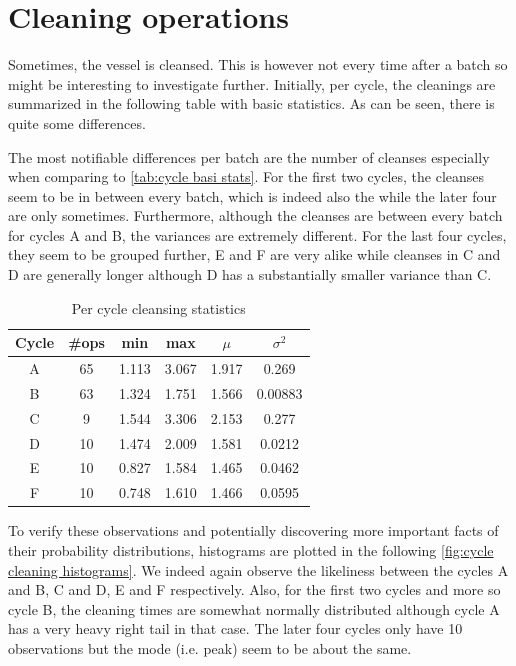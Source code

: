 \documentclass[../Thesis.tex]{subfiles}
\begin{document}


\newpage
\section{Cleaning operations}
Sometimes, the vessel is cleansed. This is however not every time after a batch so might be interesting to investigate further. Initially, per cycle, the cleanings are summarized in the following table with basic statistics. As can be seen, there is quite some differences.

The most notifiable differences per batch are the number of cleanses especially when comparing to \autoref{tab:cycle basi stats}. For the first two cycles, the cleanses seem to be in between every batch, which is indeed also the while the later four are only sometimes. Furthermore, although the cleanses are between every batch for cycles A and B, the variances are extremely different. For the last four cycles, they seem to be grouped further, E and F are very alike while cleanses in C and D are generally longer although D has a substantially smaller variance than C.

\begin{table}[h]
    \centering
    \begin{tabular}{c|c|c|c|c|c}
        Cycle & \#ops & min & max & $\mu$ & $\sigma^2$\\ \hline
        A & 65 & 1.113 & 3.067 & 1.917 & 0.269\\
        B & 63 & 1.324 & 1.751 & 1.566 & 0.00883\\
        C & 9  & 1.544 & 3.306 & 2.153 & 0.277\\
        D & 10 & 1.474 & 2.009 & 1.581 & 0.0212\\
        E & 10 & 0.827 & 1.584 & 1.465 & 0.0462\\
        F & 10 & 0.748 & 1.610 & 1.466 & 0.0595
    \end{tabular}
    \caption{Per cycle cleansing statistics}
    \label{tab:cycle cleansing stats stats}
\end{table}

To verify these observations and potentially discovering more important facts of their probability distributions, histograms are plotted in the following \autoref{fig:cycle cleaning histograms}. We indeed again observe the likeliness between the cycles A and B, C and D, E and F respectively. Also, for the first two cycles and more so cycle B, the cleaning times are somewhat normally distributed although cycle A has a very heavy right tail in that case. The later four cycles only have 10 observations but the mode (i.e. peak) seem to be about the same.
\end{document}
